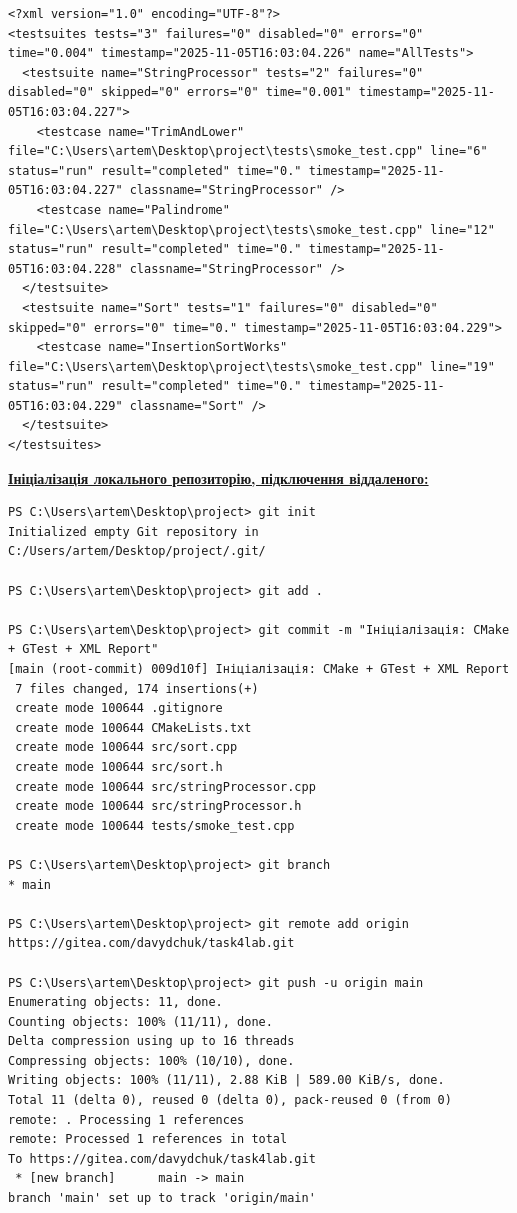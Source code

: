 \documentclass[a4paper,12pt]{article}
\begin{document}
    \begin{verbatim}
<?xml version="1.0" encoding="UTF-8"?>
<testsuites tests="3" failures="0" disabled="0" errors="0" time="0.004" timestamp="2025-11-05T16:03:04.226" name="AllTests">
  <testsuite name="StringProcessor" tests="2" failures="0" disabled="0" skipped="0" errors="0" time="0.001" timestamp="2025-11-05T16:03:04.227">
    <testcase name="TrimAndLower" file="C:\Users\artem\Desktop\project\tests\smoke_test.cpp" line="6" status="run" result="completed" time="0." timestamp="2025-11-05T16:03:04.227" classname="StringProcessor" />
    <testcase name="Palindrome" file="C:\Users\artem\Desktop\project\tests\smoke_test.cpp" line="12" status="run" result="completed" time="0." timestamp="2025-11-05T16:03:04.228" classname="StringProcessor" />
  </testsuite>
  <testsuite name="Sort" tests="1" failures="0" disabled="0" skipped="0" errors="0" time="0." timestamp="2025-11-05T16:03:04.229">
    <testcase name="InsertionSortWorks" file="C:\Users\artem\Desktop\project\tests\smoke_test.cpp" line="19" status="run" result="completed" time="0." timestamp="2025-11-05T16:03:04.229" classname="Sort" />
  </testsuite>
</testsuites>
    \end{verbatim}

    \textbf{\underline{Ініціалізація локального репозиторію, підключення віддаленого:}}

    \begin{verbatim}
PS C:\Users\artem\Desktop\project> git init 
Initialized empty Git repository in C:/Users/artem/Desktop/project/.git/

PS C:\Users\artem\Desktop\project> git add .

PS C:\Users\artem\Desktop\project> git commit -m "Ініціалізація: CMake + GTest + XML Report" 
[main (root-commit) 009d10f] Ініціалізація: CMake + GTest + XML Report
 7 files changed, 174 insertions(+)
 create mode 100644 .gitignore
 create mode 100644 CMakeLists.txt
 create mode 100644 src/sort.cpp
 create mode 100644 src/sort.h
 create mode 100644 src/stringProcessor.cpp
 create mode 100644 src/stringProcessor.h
 create mode 100644 tests/smoke_test.cpp

PS C:\Users\artem\Desktop\project> git branch 
* main

PS C:\Users\artem\Desktop\project> git remote add origin https://gitea.com/davydchuk/task4lab.git

PS C:\Users\artem\Desktop\project> git push -u origin main 
Enumerating objects: 11, done.
Counting objects: 100% (11/11), done.
Delta compression using up to 16 threads
Compressing objects: 100% (10/10), done.
Writing objects: 100% (11/11), 2.88 KiB | 589.00 KiB/s, done.
Total 11 (delta 0), reused 0 (delta 0), pack-reused 0 (from 0)
remote: . Processing 1 references
remote: Processed 1 references in total
To https://gitea.com/davydchuk/task4lab.git
 * [new branch]      main -> main
branch 'main' set up to track 'origin/main'
    \end{verbatim}
\end{document}
